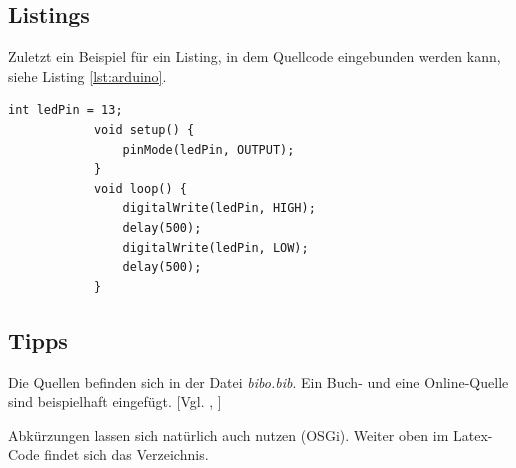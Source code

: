 	\subsection{Listings}
		Zuletzt ein Beispiel für ein Listing, in dem Quellcode eingebunden werden kann, siehe Listing \ref{lst:arduino}.

		\vspace{1em}
		\begin{lstlisting}[caption=Arduino Beispielprogramm, label=lst:arduino]
			int ledPin = 13;
			void setup() {
				pinMode(ledPin, OUTPUT);
			}
			void loop() {
				digitalWrite(ledPin, HIGH);
				delay(500);
				digitalWrite(ledPin, LOW);
				delay(500);
			}
		\end{lstlisting}

	\subsection{Tipps}
		Die Quellen befinden sich in der Datei \textit{bibo.bib}. Ein Buch- und eine Online-Quelle sind beispielhaft eingefügt. [Vgl. \cite{buch}, \cite{online}]

		Abkürzungen lassen sich natürlich auch nutzen (\ac{OSGi}). Weiter oben im Latex-Code findet sich das Verzeichnis.
		\pagebreak
